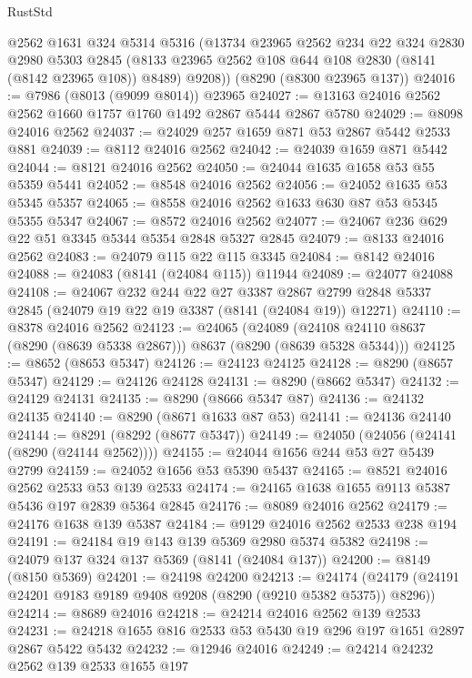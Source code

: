 \begin{lexlean}{RustStd}
\begin{coremodule}
      @2562
      @1631
      @324
      @5314
      @5316
      (@13734
        @23965
        @2562
        @234
        @22
        @324
        @2830
        @2980
        @5303
        @2845
        (@8133 @23965 @2562 @108 @644 @108 @2830 (@8141 (@8142 @23965 @108)) @8489)
        @9208))
    (@8290 (@8300 @23965 @137))
@24016 := @7986 (@8013 (@9099 @8014)) @23965
@24027 := @13163 @24016 @2562 @2562 @1660 @1757 @1760 @1492 @2867 @5444 @2867 @5780
@24029 := @8098 @24016 @2562
@24037 := @24029 @257 @1659 @871 @53 @2867 @5442 @2533 @881
@24039 := @8112 @24016 @2562
@24042 := @24039 @1659 @871 @5442
@24044 := @8121 @24016 @2562
@24050 := @24044 @1635 @1658 @53 @55 @5359 @5441
@24052 := @8548 @24016 @2562
@24056 := @24052 @1635 @53 @5345 @5357
@24065 := @8558 @24016 @2562 @1633 @630 @87 @53 @5345 @5355 @5347
@24067 := @8572 @24016 @2562
@24077 := @24067 @236 @629 @22 @51 @3345 @5344 @5354 @2848 @5327 @2845
@24079 := @8133 @24016 @2562
@24083 := @24079 @115 @22 @115 @3345
@24084 := @8142 @24016
@24088 := @24083 (@8141 (@24084 @115)) @11944
@24089 := @24077 @24088
@24108 := @24067
    @232
    @244
    @22
    @27
    @3387
    @2867
    @2799
    @2848
    @5337
    @2845
    (@24079 @19 @22 @19 @3387 (@8141 (@24084 @19)) @12271)
@24110 := @8378 @24016 @2562
@24123 := @24065
    (@24089 (@24108 @24110 @8637 (@8290 (@8639 @5338 @2867))) @8637 (@8290 (@8639 @5328 @5344)))
@24125 := @8652 (@8653 @5347)
@24126 := @24123 @24125
@24128 := @8290 (@8657 @5347)
@24129 := @24126 @24128
@24131 := @8290 (@8662 @5347)
@24132 := @24129 @24131
@24135 := @8290 (@8666 @5347 @87)
@24136 := @24132 @24135
@24140 := @8290 (@8671 @1633 @87 @53)
@24141 := @24136 @24140
@24144 := @8291 (@8292 (@8677 @5347))
@24149 := @24050 (@24056 (@24141 (@8290 (@24144 @2562))))
@24155 := @24044 @1656 @244 @53 @27 @5439 @2799
@24159 := @24052 @1656 @53 @5390 @5437
@24165 := @8521 @24016 @2562 @2533 @53 @139 @2533
@24174 := @24165 @1638 @1655 @9113 @5387 @5436 @197 @2839 @5364 @2845
@24176 := @8089 @24016 @2562
@24179 := @24176 @1638 @139 @5387
@24184 := @9129 @24016 @2562 @2533 @238 @194
@24191 := @24184 @19 @143 @139 @5369 @2980 @5374 @5382
@24198 := @24079 @137 @324 @137 @5369 (@8141 (@24084 @137))
@24200 := @8149 (@8150 @5369)
@24201 := @24198 @24200
@24213 := @24174 (@24179 (@24191 @24201 @9183 @9189 @9408 @9208 (@8290 (@9210 @5382 @5375)) @8296))
@24214 := @8689 @24016
@24218 := @24214 @24016 @2562 @139 @2533
@24231 := @24218 @1655 @816 @2533 @53 @5430 @19 @296 @197 @1651 @2897 @2867 @5422 @5432
@24232 := @12946 @24016
@24249 := @24214
    @24232
    @2562
    @139
    @2533
    @1655
    @197

\end{coremodule}
\end{lexlean}
